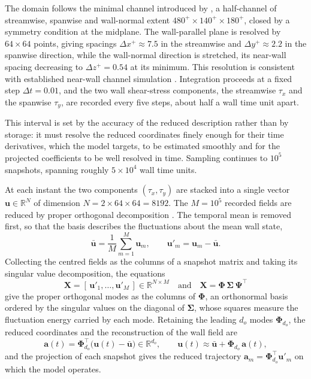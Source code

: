 \documentclass[pdflatex,sn-basic]{sn-jnl}
\newcommand{\R}{\mathbb{R}}
\newcommand{\bfa}{\bm{a}}
\newcommand{\bfPhi}{\bm{\Phi}}
\newcommand{\bfSigma}{\bm{\Sigma}}
\newcommand{\bfu}{\bm{u}}
\theoremstyle{thmstyleone}%
\theoremstyle{thmstyletwo}%
\theoremstyle{thmstylethree}%
\begin{document}
The domain follows the minimal channel introduced by
\citet{jimenez1991minimal}, a half-channel of streamwise, spanwise and
wall-normal extent $480^+ \times 140^+ \times 180^+$, closed by a symmetry
condition at the midplane. The wall-parallel plane is resolved by $64 \times 64$
points, giving spacings $\Delta x^+ \approx 7.5$ in the streamwise and
$\Delta y^+ \approx 2.2$ in the spanwise direction, while the wall-normal
direction is stretched, its near-wall spacing decreasing to
$\Delta z^+ = 0.54$ at its minimum. This resolution is consistent with established
near-wall channel simulation \citep{kim1987turbulence}. Integration proceeds
at a fixed step $\Delta t = 0.01$, and the two wall shear-stress components, the
streamwise $\tau_x$ and the spanwise $\tau_y$, are recorded every five steps, about
half a wall time unit apart.

This interval is set by the accuracy of
the reduced description rather than by storage: it must resolve the reduced
coordinates finely enough for their time derivatives, which the model targets, to
be estimated smoothly and for the projected coefficients to be well resolved in
time. Sampling continues to $10^5$ snapshots, spanning roughly $5 \times 10^4$
wall time units.

At each instant the two components
$(\tau_x,\tau_y)$ are stacked into a single vector $\bfu\in\R^{N}$ of dimension
$N = 2\times 64\times 64 = 8192$. The $M = 10^5$ recorded fields are reduced by
proper orthogonal decomposition \citep{lumley1967structure,sirovich1987turbulence}. The temporal
mean is removed first, so that the
basis describes the fluctuations about the mean wall state,
\begin{equation}
	\bar{\bfu} = \frac{1}{M}\sum_{m=1}^{M}\bfu_m, \qquad
	\bfu'_m = \bfu_m - \bar{\bfu}.
	\label{eq:fluct}
\end{equation}
Collecting the centred fields as the columns of a snapshot matrix and taking its
singular value decomposition, the equations
\begin{equation}
	\mathbf{X} = [\,\bfu'_1,\dots,\bfu'_M\,]\in\R^{N\times M}
	\quad\text{and}\quad
	\mathbf{X} = \bfPhi\,\bfSigma\,\bm{\Psi}^{\top}
	\label{eq:svd}
\end{equation}
give the proper orthogonal modes as the columns of $\bfPhi$, an orthonormal
basis ordered by the singular values on the diagonal of $\bfSigma$, whose squares
measure the fluctuation energy carried by each mode. Retaining the leading $d_o$
modes $\bfPhi_{d_o}$, the reduced coordinates and the reconstruction of the wall
field are
\begin{equation}
	\bfa(t) = \bfPhi_{d_o}^{\top}\big(\bfu(t)-\bar{\bfu}\big)\in\R^{d_o},
	\qquad
	\bfu(t)\approx\bar{\bfu} + \bfPhi_{d_o}\,\bfa(t),
	\label{eq:reduced}
\end{equation}
and the projection of each snapshot gives the reduced trajectory
$\bfa_m = \bfPhi_{d_o}^{\top}\bfu'_m$ on which the model operates.
\end{document}
